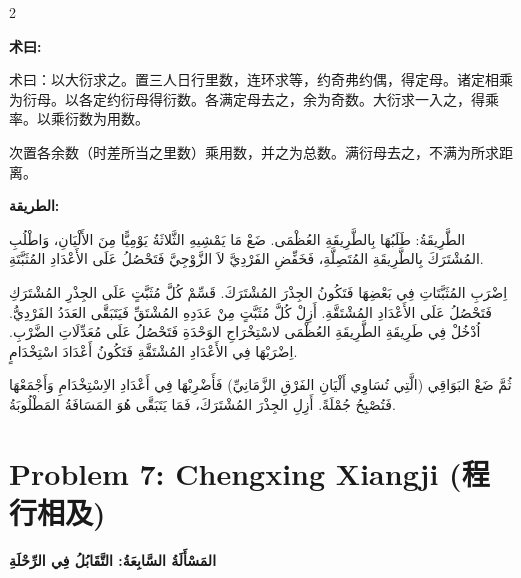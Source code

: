 \documentclass[11pt,a4paper]{article}
\newcommand{\ar}[1]{\arabicfont\beginR #1\endR}
\newcommand{\zhtext}[1]{{\chinese #1}}
\newenvironment{bilingual}{%
  \begin{paracol}{2}
}{%
  \end{paracol}
}
\newcommand{\cnlabel}[1]{\textcolor{algocolor}{\textbf{#1}}}
\newcommand{\arlabel}[1]{\ar{\textcolor{algocolor}{\textbf{#1}}}}
\begin{document}
\begin{bilingual}

\begin{leftcolumn*}
\cnlabel{术曰:}

术曰：以大衍求之。置三人日行里数，连环求等，约奇弗约偶，得定母。诸定相乘为衍母。以各定约衍母得衍数。各满定母去之，余为奇数。大衍求一入之，得乘率。以乘衍数为用数。

次置各余数（时差所当之里数）乘用数，并之为总数。满衍母去之，不满为所求距离。
\end{leftcolumn*}

\begin{rightcolumn*}
\arlabel{الطريقة:}

\ar{الطَّرِيقَةُ: طَلَبُهَا بِالطَّرِيقَةِ العُظْمَى. ضَعْ مَا يَمْشِيهِ الثَّلاثَةُ يَوْمِيًّا مِنَ الأَلْيَانِ، وَاطْلُبِ المُشْتَرَكَ بِالطَّرِيقَةِ المُتَصِلَّةِ، فَخَفِّضِ الفَرْدِيَّ لاَ الزَّوْجِيَّ فَتَحْصُلُ عَلَى الأَعْدَادِ المُثَبَّتَةِ.}

\ar{اِضْرَبِ المُثَبَّتَاتِ فِي بَعْضِهَا فَتَكُونُ الجِذْرَ المُشْتَرَكَ. قَسِّمْ كُلَّ مُثَبَّتٍ عَلَى الجِذْرِ المُشْتَرَكِ فَتَحْصُلُ عَلَى الأَعْدَادِ المُشْتَقَّةِ. أَزِلْ كُلَّ مُثَبَّتٍ مِنْ عَدَدِهِ المُشْتَقِّ فَيَتَبَقَّى العَدَدُ الفَرْدِيُّ. اُدْخُلْ فِي طَرِيقَةِ الطَّرِيقَةِ العُظْمَى لاسْتِخْرَاجِ الوَحْدَةِ فَتَحْصُلُ عَلَى مُعَدِّلَاتِ الضَّرْبِ. اِضْرَبْهَا فِي الأَعْدَادِ المُشْتَقَّةِ فَتَكُونُ أَعْدَادَ اسْتِخْدَامٍ.}

\ar{ثُمَّ ضَعْ البَوَاقِي (الَّتِي تُسَاوِي أَلْيَانِ الفَرْقِ الزَّمَانِيِّ) فَأَضْرِبْهَا فِي أَعْدَادِ الاِسْتِخْدَامِ وَأَجْمَعْهَا فَتُصْبِحُ جُمْلَةً. أَزِلِ الجِذْرَ المُشْتَرَكَ، فَمَا يَتَبَقَّى هُوَ المَسَافَةُ المَطْلُوبَةُ.}
\end{rightcolumn*}

\end{bilingual}

\newpage

\section{Problem 7: Chengxing Xiangji (\zhtext{程行相及})}
\ar{\textbf{المَسْأَلَةُ السَّابِعَةُ: التَّقَابُلُ فِي الرِّحْلَةِ}}
\end{document}
